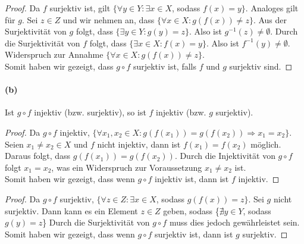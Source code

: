 \documentclass[12pt, letterpaper]{article}
\begin{document}
\begin{proof}

\noindent Da $f$ surjektiv ist, gilt $\{\forall y \in Y: \exists x \in X$, sodass $f(x) = y\}$. Analoges gilt für $g$. Sei $z \in Z$ und wir nehmen an, dass $\{\forall x \in X: g(f(x)) \neq z\}$.
Aus der Surjektivität von $g$ folgt, dass $\{\exists y \in Y: g(y) = z\}$. Also ist $g^{-1}(z) \neq \emptyset$. Durch die Surjektivität von $f$ folgt, dass $\{\exists x \in X: f(x) = y\}$. Also ist $f^{-1}(y) \neq \emptyset$. Widerspruch zur Annahme $\{\forall x \in X: g(f(x)) \neq z\}$.\\

\noindent Somit haben wir gezeigt, dass $g \circ f$ surjektiv ist, falls $f$ und $g$ surjektiv sind.

\end{proof}

\paragraph{(b)} Ist $g \circ f$ injektiv (bzw. surjektiv), so ist $f$ injektiv (bzw. $g$ surjektiv).

\begin{proof}

\noindent Da $g \circ f$ injektiv, $\{\forall x_1, x_2 \in X: g(f(x_1)) = g(f(x_2)) \Rightarrow x_1 = x_2\}$. Seien $x_1 \neq x_2 \in X$ und $f$ nicht injektiv, dann ist $f(x_1) = f(x_2)$ möglich.
Daraus folgt, dass $g(f(x_1)) = g(f(x_2))$. Durch die Injektivität von $g \circ f$ folgt $x_1 = x_2$, was ein Widerspruch zur Voraussetzung $x_1 \neq x_2$ ist.\\

\noindent Somit haben wir gezeigt, dass wenn $g \circ f$ injektiv ist, dann ist $f$ injektiv.

\end{proof}

\begin{proof}

\noindent Da $g \circ f$ surjektiv, $\{\forall z \in Z: \exists x \in X$, sodass $g(f(x)) = z\}$. Sei $g$ nicht surjektiv. Dann kann es ein Element $z \in Z$ geben, sodass \{$\nexists y \in Y$, sodass $g(y) = z$\} Durch die Surjektivität von $g \circ f$ muss dies jedoch gewährleistet sein.\\

\noindent Somit haben wir gezeigt, dass wenn $g \circ f$ surjektiv ist, dann ist $g$ surjektiv.

\end{proof}
\end{document}
